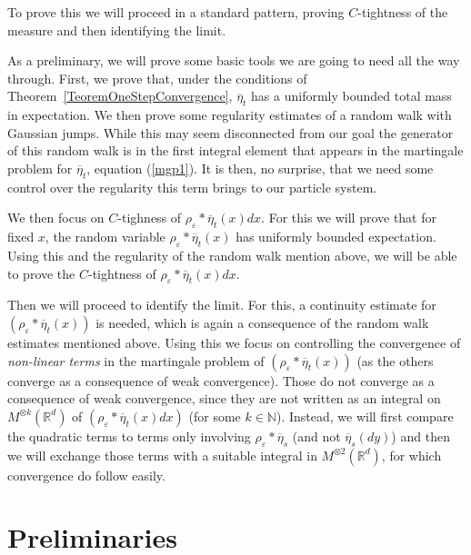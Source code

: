 \documentclass[a4paper,12pt]{article}
\newcommand{\1}{{\bf {1}}}
\def\epsilon{\varepsilon}
\begin{document}
To prove this we will proceed in a standard pattern, proving $C$-tightness of the measure and then identifying the limit.

As a preliminary, we will prove some basic tools we are going to need all the way through. First, we prove that, under the conditions of Theorem~\ref{TeoremOneStepConvergence}, $\overline{\eta}_t$ has a uniformly bounded total mass in expectation. We then prove some regularity estimates of a random walk with Gaussian jumps. While this may seem disconnected from our goal the generator of this random walk is in the first integral element that appears in the martingale problem for $\overline{\eta}_t$, equation (\ref{mgp1}). It is then, no surprise, that we need some control over the regularity this term brings to our particle system.

We then focus on $C$-tighness of $\rho_\epsilon * \overline{\eta}_t(x)dx$. For this we will prove that for fixed $x$, the random variable $\rho_\epsilon*\overline{\eta}_t(x)$ has uniformly bounded expectation. Using this and the regularity of the random walk mention above, we will be able to prove the $C$-tightness of $\rho_\epsilon * \overline{\eta}_t(x)dx$.

Then we will proceed to identify the limit. For this, a continuity estimate for $(\rho_\epsilon*\overline{\eta}_t(x))$ is needed, which is again a consequence of the random walk estimates mentioned above. Using this we focus on controlling the convergence of \textit{non-linear terms} in the martingale problem of $(\rho_\epsilon*\overline{\eta}_t(x))$ (as the others converge as a consequence of weak convergence). Those do not converge as a consequence of weak convergence, since they are not written as an integral on $M^{\otimes k}(\mathbb{R}^d)$ of $(\rho_\epsilon*\overline{\eta}_t(x) dx)$ (for some $k \in \mathbb{N}$). Instead, we will first compare the quadratic terms to terms only involving $\rho_\epsilon*\overline{\eta}_s$ (and not $\overline{\eta}_s(dy)$) and then we will exchange those terms with a suitable integral in $M^{\otimes2}(\mathbb{R}^d)$, for which convergence do follow easily.

\section{Preliminaries}
\end{document}
